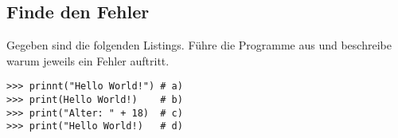 \subsection{Finde den Fehler }
Gegeben sind die folgenden Listings. Führe die Programme aus und beschreibe warum jeweils ein Fehler auftritt.
\begin{lstlisting}
>>> prinnt("Hello World!") # a)
>>> print(Hello World!)    # b)
>>> print("Alter: " + 18)  # c)
>>> print("Hello World!)   # d)
\end{lstlisting}
